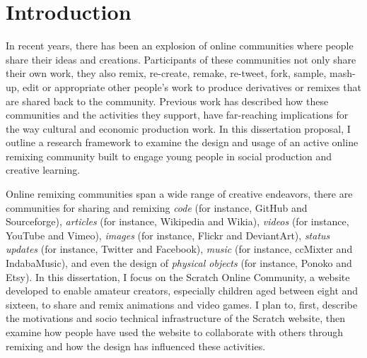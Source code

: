 \chapter{Introduction}

In recent years, there has been an explosion of online communities where people share their ideas and creations.
Participants of these communities not only share their own work, they also remix, re-create, remake, re-tweet, fork, sample, mash-up, edit or appropriate other people's work to produce derivatives or remixes that are shared back to the community.
Previous work has described how these communities and the activities they support, have far-reaching implications for the way cultural and economic production work.
In this dissertation proposal, I outline a research framework to examine the design and usage of an active online remixing community built to engage young people in social production and creative learning.

Online remixing communities span a wide range of creative endeavors, there are communities for sharing and remixing 
\emph{code} (for instance, GitHub and Sourceforge),
\emph{articles} (for instance, Wikipedia and Wikia), 
\emph{videos} (for instance, YouTube and Vimeo), 
\emph{images} (for instance, Flickr and DeviantArt), 
\emph{status updates} (for instance, Twitter and Facebook),
\emph{music} (for instance, ccMixter and IndabaMusic),
and even the design of \emph{physical objects} (for instance, Ponoko and Etsy).
In this dissertation, I focus on the Scratch Online Community, a website developed to enable amateur creators, especially children aged between eight and sixteen, to share and remix animations and video games.
I plan to, first, describe the motivations and socio technical infrastructure of the Scratch website, then examine how people have used the website to collaborate with others through remixing and how the design has influenced these activities.
